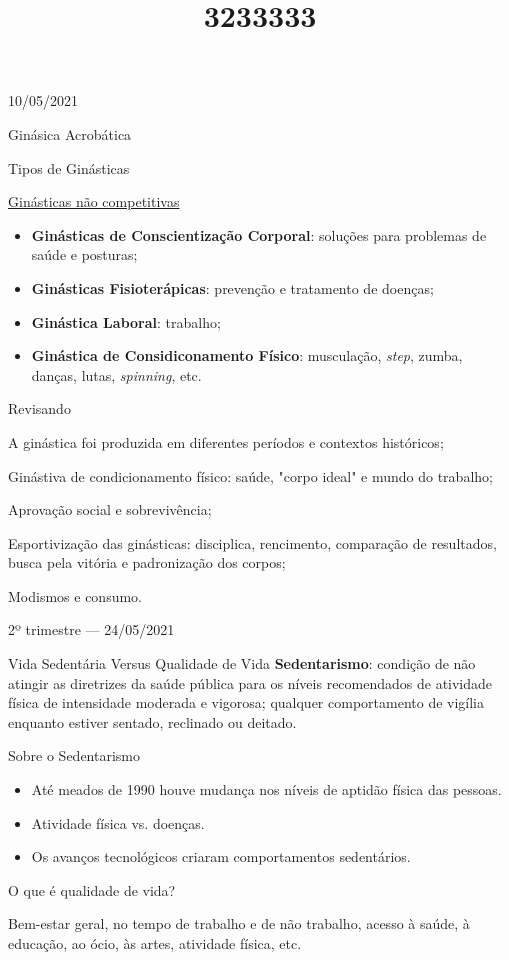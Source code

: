 \documentclass{SchoolBook}
\begin{document}
    \begin{day}{10/05/2021}
        \title{3}{Ginásica Acrobática}
        
        \title{2}{Tipos de Ginásticas}
        
        \title{3}{\underline{Ginásticas não competitivas}}
        
        \begin{itemize}[nosep]
            \item \textbf{Ginásticas de Conscientização Corporal}: soluções para problemas de saúde e posturas;
            \item \textbf{Ginásticas Fisioterápicas}: prevenção e tratamento de doenças;
            \item \textbf{Ginástica Laboral}: trabalho;
            \item \textbf{Ginástica de Considiconamento Físico}: musculação, \textit{step}, zumba, danças, lutas, \textit{spinning}, etc.
        \end{itemize}
        
        \title{3}{Revisando}
        
        A ginástica foi produzida em diferentes períodos e contextos históricos;
        
        Ginástiva de condicionamento físico: saúde, "corpo ideal" e mundo do trabalho;
        
        Aprovação social e sobrevivência;
        
        Esportivização das ginásticas: disciplica, rencimento, comparação de resultados, busca pela vitória e padronização dos corpos;
        
        Modismos e consumo.
    \end{day}
    
    \begin{day}{2º trimestre --- 24/05/2021}
        \title{3}{Vida Sedentária Versus Qualidade de Vida}
        \textbf{Sedentarismo}: condição de não atingir as diretrizes da saúde pública para os níveis recomendados de atividade física de intensidade moderada e vigorosa; qualquer comportamento de vigília enquanto estiver sentado, reclinado ou deitado.
        
        \title{3}{Sobre o Sedentarismo}
        
        \begin{itemize}[nosep]
            \item Até meados de 1990 houve mudança nos níveis de aptidão física das pessoas.
            \item Atividade física vs. doenças.
            \item Os avanços tecnológicos criaram comportamentos sedentários.
        \end{itemize}
        
        \title{3}{O que é qualidade de vida?}
        
        Bem-estar geral, no tempo de trabalho e de não trabalho, acesso à saúde, à educação, ao ócio, às artes, atividade física, etc.
    \end{day}
    
\end{document}

